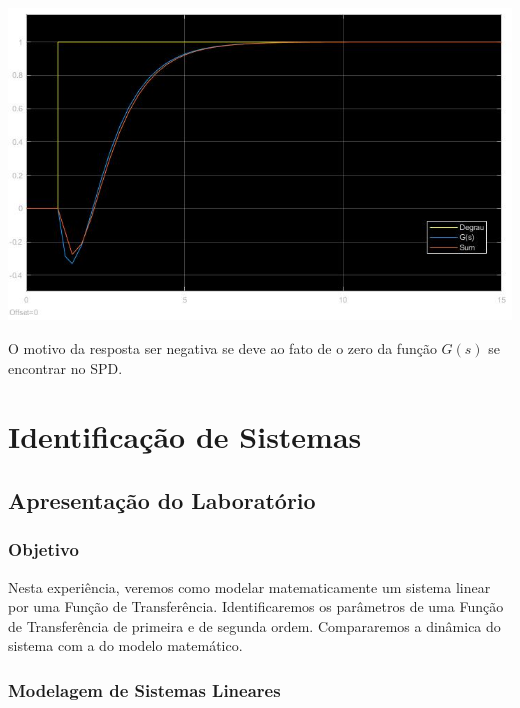 \documentclass[
]{book}
\begin{document}
\includegraphics{Imagens/Lab2/prob6C.jpg}

O motivo da resposta ser negativa se deve ao fato de o zero da função \(G(s)\) se encontrar no SPD.

\hypertarget{identificauxe7uxe3o-de-sistemas}{%
\chapter{Identificação de Sistemas}\label{identificauxe7uxe3o-de-sistemas}}

\hypertarget{apresentauxe7uxe3o-do-laboratuxf3rio-1}{%
\section{Apresentação do Laboratório}\label{apresentauxe7uxe3o-do-laboratuxf3rio-1}}

\hypertarget{objetivo-1}{%
\subsection{Objetivo}\label{objetivo-1}}

Nesta experiência, veremos como modelar matematicamente um sistema linear por uma Função de Transferência. Identificaremos os parâmetros de uma Função de Transferência de primeira e de segunda ordem. Compararemos a dinâmica do sistema com a do modelo matemático.

\hypertarget{modelagem-de-sistemas-lineares}{%
\subsection{Modelagem de Sistemas Lineares}\label{modelagem-de-sistemas-lineares}}
\end{document}
